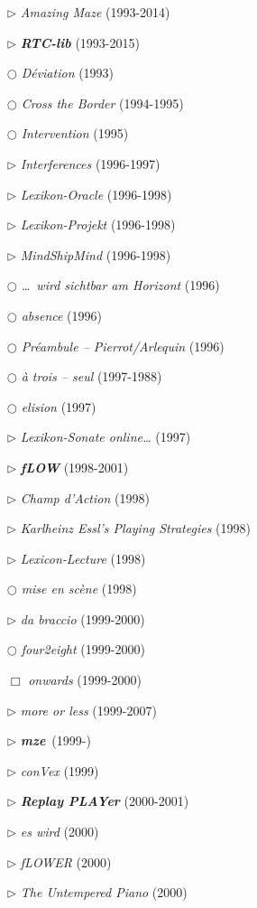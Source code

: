 \documentclass[a4paper,12pt]{article}
\newcommand{\maze}[0]{\emph{m\symbol{64}ze\textdegree2}}
\begin{document}
\begin{itemize}
\item[$\rhd$] \emph{Amazing Maze} (1993-2014)
\item[$\rhd$] \textbf{\emph{RTC-lib}} (1993-2015)
\item[$\bigcirc$] \emph{Déviation} (1993)
\item[$\bigcirc$] \emph{Cross the Border} (1994-1995)
\item[$\bigcirc$] \emph{Intervention} (1995)
\item[$\rhd$] \emph{Interferences} (1996-1997)
\item[$\rhd$] \emph{Lexikon-Oracle} (1996-1998)
\item[$\rhd$] \emph{Lexikon-Projekt} (1996-1998)
\item[$\rhd$] \emph{MindShipMind} (1996-1998)
\item[$\bigcirc$] \emph{\dots~wird sichtbar am Horizont} (1996)
\item[$\bigcirc$] \emph{absence} (1996)
\item[$\bigcirc$] \emph{Préambule – Pierrot/Arlequin} (1996)
\item[$\bigcirc$] \emph{à trois – seul} (1997-1988)
\item[$\bigcirc$] \emph{elision} (1997)
\item[$\rhd$] \emph{Lexikon-Sonate online\dots} (1997)
\item[$\rhd$] \textbf{\emph{fLOW}} (1998-2001)
\item[$\rhd$] \emph{Champ d'Action} (1998)
\item[$\rhd$] \emph{Karlheinz Essl's Playing Strategies} (1998)
\item[$\rhd$] \emph{Lexicon-Lecture} (1998)
\item[$\bigcirc$] \emph{mise en scène} (1998)
\item[$\rhd$] \emph{da braccio} (1999-2000)
\item[$\bigcirc$] \emph{four2eight} (1999-2000)
\item[$\Box$] \emph{onwards} (1999-2000)
\item[$\rhd$] \emph{more or less} (1999-2007)
\item[$\rhd$] \textbf{\maze}~(1999-)
\item[$\rhd$] \emph{conVex} (1999)
\item[$\rhd$] \textbf{\emph{Replay PLAYer}} (2000-2001)
\item[$\rhd$] \emph{es wird} (2000)
\item[$\rhd$] \emph{fLOWER} (2000)
\item[$\rhd$] \emph{The Untempered Piano} (2000)

\end{itemize}
\end{document}
